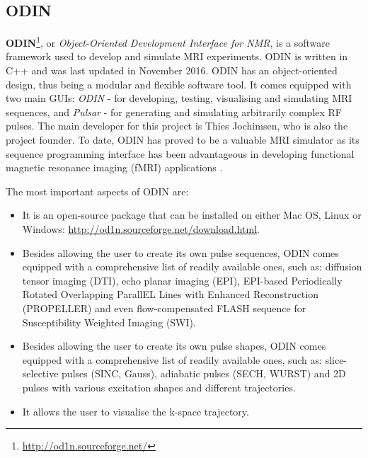 \hfill

\subsection{ODIN}
\textbf{ODIN}\footnote{\url{http://od1n.sourceforge.net/}}, or \textit{Object-Oriented Development Interface for NMR}, is a software framework used to develop and simulate MRI experiments.
ODIN is written in C++ and was last updated in November 2016.
ODIN has an object-oriented design, thus being a modular and flexible software tool.
It comes equipped with two main GUIs: \textit{ODIN} - for developing, testing, visualising and simulating MRI sequences, and \textit{Pulsar} - for generating and simulating arbitrarily complex RF pulses.
The main developer for this project is Thies Jochimsen, who is also the project founder.
To date, ODIN has proved to be a valuable MRI simulator as its sequence programming interface has been advantageous in developing functional magnetic resonance imaging (fMRI) applications \cite{Schafer2004}.

\hfill

The most important aspects of ODIN are:
\begin{itemize}

    \item It is an open-source package that can be installed on either Mac OS, Linux or Windows: \url{http://od1n.sourceforge.net/download.html}.
    
    \item Besides allowing the user to create its own pulse sequences, ODIN comes equipped with a comprehensive list of readily available ones, such as: diffusion tensor imaging (DTI), echo planar imaging (EPI), EPI-based Periodically Rotated Overlapping ParallEL Lines with Enhanced Reconstruction (PROPELLER) and even flow-compensated FLASH sequence for Susceptibility Weighted Imaging (SWI).
    
    \item Besides allowing the user to create its own pulse shapes, ODIN comes equipped with a comprehensive list of readily available ones, such as: slice-selective pulses (SINC, Gauss), 
    adiabatic pulses (SECH, WURST) and 2D pulses with various excitation shapes and different trajectories.
    
    \item It allows the user to visualise the k-space trajectory.
    
\end{itemize}

